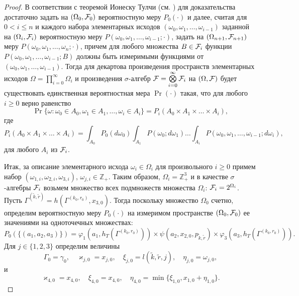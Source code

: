 \documentclass[a4paper,12pt,russian]{extarticle}
\begin{document}
\begin{proof}
В соответствии с теоремой Ионеску Тулчи (см. \cite{Shiryaev}) для доказательства достаточно задать на $(\Omega_0, {\cal F}_0)$ вероятностную меру $P_0(\cdot)$ и далее, считая для $0 < i \leqslant n$ и каждого набора элементарных исходов $(\omega_0, \omega_1, \ldots, \omega_{i-1})$ заданной на $(\Omega_i, {\cal F}_i)$ вероятностную меру $P(\omega_0,\omega_1,\ldots, \omega_{i-1};\cdot)$, задать на $(\Omega_{n+1}, {\cal F}_{n+1})$ меру $P(\omega_0,\omega_1,\ldots, \omega_{n};\cdot)$, причем для любого множества $B\in {\cal F}_i$ функции $P(\omega_0,\omega_1,\ldots, \omega_{i-1};B)$
должны быть измеримыми функциями от $(\omega_0, \omega_1, \ldots, \omega_{i-1})$. Тогда для декартова произведения пространств элементарных исходов $\Omega=\prod\limits_{i=0}^{\infty}\Omega_i$ и произведения $\sigma$-алгебр ${\cal F}=\bigotimes\limits_{i=0}^{\infty} {\cal F}_i$ на $(\Omega,{\cal F})$ будет существовать единственная вероятностная мера $\Pr(\cdot)$ такая, что для любого $i \geqslant 0$ верно равенство
\begin{equation}
\Pr\{\omega \colon \omega_0 \in A_0, \omega_1 \in A_1, \ldots, \omega_i\in A_i\} = P_i(A_0 \times A_1 \times \ldots \times A_i),
\label{ProbabilitiesGeneral}
\end{equation}
где 
\begin{equation}
 P_i(A_0 \times A_1 \times \ldots \times A_i) = \int_{A_0} P_0(d \omega_0) \int_{A_1} P(\omega_0;d \omega_1) \ldots \int_{A_i} P(\omega_0, \omega_1, \ldots, \omega_{i-1}; d \omega_i),
\label{ProbabilitiesGeneralOne}
\end{equation}
для любого $A_i$ из ${\cal F}_i$. 

Итак, за описание элементарного исхода $\omega_i \in \Omega_i$ для произвольного $i \geqslant 0$ примем набор $(\omega_{1,i},\omega_{2,i},\omega_{3,i})$, $\omega_{j,i}\in \mathbb{Z}_+$. Таким образом, $\Omega_i=\mathbb{Z}_+^3$ и в качестве $\sigma$-алгебры ${\cal F}_i$ возьмем множество всех подмножеств множества $\Omega_i$: ${\cal F}_i=2^{\Omega_i}$. Пусть $\Gamma^{(\tilde{k},\tilde{r})}=h(\Gamma^{(k_0,r_0)},x_{3,0})$. Тогда  поскольку множество $\Omega_0$ счетно, определим вероятностную меру $P_0(\cdot)$ на измеримом пространстве $(\Omega_0,{\cal F}_0)$ ее значениями на одноточечных множествах:
\begin{equation}
P_0(\{(a_1,a_2,a_3)\})=\varphi_1(a_1,h_T(\Gamma^{(k_0,r_0)})) \times \psi(a_2,x_{2,0}, p_{\tilde{k},\tilde{r}}) \times \varphi_3(a_3,h_T(\Gamma^{(k_0,r_0)})).
\label{probabilitiesOne}
\end{equation}
Для $j\in \{1,2,3\}$ определим величины
\begin{equation}
\Gamma_0=\gamma_0, \quad \varkappa_{j,0}=x_{j,0}, \quad \xi_{j,0}=l(\tilde{k},\tilde{r},j), \quad \eta_{j,0}=\omega_{j,0},
\label{startRekOne}
\end{equation}
и
\begin{equation}
 \varkappa_{4,0}=x_{4,0}, \quad \xi_{4,0}=x_{4,0}, \quad \eta_{4,0}=\min\{\xi_{1,0}, x_{1,0}+\eta_{1,0}\}.
\label{startRekTwo}
\end{equation}


\end{proof}
\end{document}
